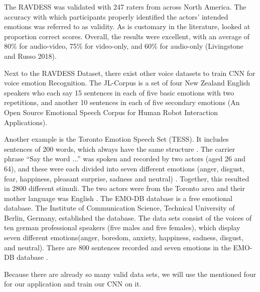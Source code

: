 The RAVDESS was validated with 247 raters from across North America. The accuracy with which participants properly identified the actors' intended emotions was referred to as validity. As is customary in the literature,  looked at proportion correct scores. Overall, the results were excellent, with an average of 80\% for audio-video, 75\% for video-only, and 60\% for audio-only (Livingstone and Russo 2018).

Next to the RAVDESS Dataset, there exist other voice datasets to train CNN for voice emotion Recognition. The JL-Corpus is a set of four New Zealand English speakers who each say 15 sentences in each of five basic emotions with two repetitions, and another 10 sentences in each of five secondary emotions (An Open Source Emotional Speech Corpus for Human Robot Interaction Applications).

Another example is the Toronto Emotion Speech Set (TESS). It includes sentences of 200 words,  which always have the same structure \cite{pichora-fuller_toronto_2020}. The carrier phrase ``Say the word ...'' was spoken and recorded by two actors (aged 26 and 64), and these were each divided into seven different emotions (anger, disgust, fear, happiness, pleasant surprise, sadness and neutral) \cite{pichora-fuller_toronto_2020}. Together, this resulted in 2800 different stimuli. The two actors were from the Toronto area and their mother language was English  \cite{pichora-fuller_toronto_2020}. The EMO-DB database is a free emotional database. The Institute of Communication Science, Technical University of Berlin, Germany, established the database. The data sets consist of  the voices of ten german professional speakers (five males and five females), which display seven different emotions(anger, boredom,  anxiety, happiness, sadness, disgust, and neutral). There are 800 sentences recorded and seven emotions in the EMO-DB database \cite{burkhardt_database_2005}.

Because there are already so many valid data sets, we will use the mentioned four for our application and train our CNN on it. 

